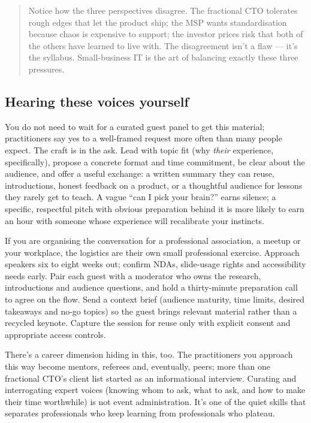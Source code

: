 \begin{quote}\small
Notice how the three perspectives disagree. The fractional CTO tolerates rough edges that let the product ship; the MSP wants standardisation because chaos is expensive to support; the investor prices risk that both of the others have learned to live with. The disagreement isn't a flaw — it's the syllabus. Small-business IT is the art of balancing exactly these three pressures.
\end{quote}



\subsection{Hearing these voices yourself}


You do not need to wait for a curated guest panel to get this material; practitioners say yes to a well-framed request more often than many people expect. The craft is in the ask. Lead with topic fit (why \emph{their} experience, specifically), propose a concrete format and time commitment, be clear about the audience, and offer a useful exchange: a written summary they can reuse, introductions, honest feedback on a product, or a thoughtful audience for lessons they rarely get to teach. A vague ``can I pick your brain?'' earns silence; a specific, respectful pitch with obvious preparation behind it is more likely to earn an hour with someone whose experience will recalibrate your instincts.


If you are organising the conversation for a professional association, a meetup or your workplace, the logistics are their own small professional exercise. Approach speakers six to eight weeks out; confirm NDAs, slide-usage rights and accessibility needs early. Pair each guest with a moderator who owns the research, introductions and audience questions, and hold a thirty-minute preparation call to agree on the flow. Send a context brief (audience maturity, time limits, desired takeaways and no-go topics) so the guest brings relevant material rather than a recycled keynote. Capture the session for reuse only with explicit consent and appropriate access controls.


There's a career dimension hiding in this, too. The practitioners you approach this way become mentors, referees and, eventually, peers; more than one fractional CTO's client list started as an informational interview. Curating and interrogating expert voices (knowing whom to ask, what to ask, and how to make their time worthwhile) is not event administration. It's one of the quiet skills that separates professionals who keep learning from professionals who plateau.

